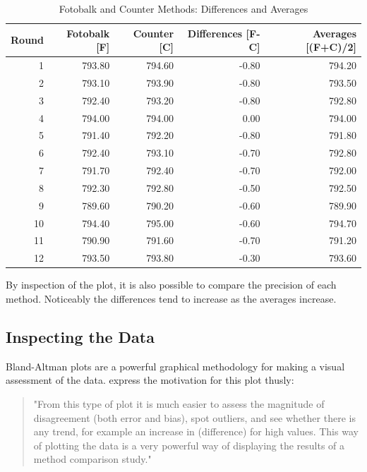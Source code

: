 \documentclass[Chap1main.tex]{subfiles}
\begin{document}
\begin{table}[tbh]
\begin{center}

\begin{tabular}{rrrrr}
  \hline
 Round & Fotobalk [F] & Counter [C] & Differences [F-C] & Averages [(F+C)/2] \\
  \hline
1 & 793.80 & 794.60 & -0.80 & 794.20 \\
  2 & 793.10 & 793.90 & -0.80 & 793.50 \\
  3 & 792.40 & 793.20 & -0.80 & 792.80 \\
  4 & 794.00 & 794.00 & 0.00 & 794.00 \\
  5 & 791.40 & 792.20 & -0.80 & 791.80 \\
  6 & 792.40 & 793.10 & -0.70 & 792.80 \\
  7 & 791.70 & 792.40 & -0.70 & 792.00 \\
  8 & 792.30 & 792.80 & -0.50 & 792.50 \\
  9 & 789.60 & 790.20 & -0.60 & 789.90 \\
  10 & 794.40 & 795.00 & -0.60 & 794.70 \\
  11 & 790.90 & 791.60 & -0.70 & 791.20 \\
  12 & 793.50 & 793.80 & -0.30 & 793.60 \\
   \hline
\end{tabular}
\caption{Fotobalk and Counter Methods: Differences and Averages}
\end{center}
\end{table}



\newpage
By inspection of the plot, it is also possible to compare the
precision of each method. Noticeably the differences tend to
increase as the averages increase.

\subsection{Inspecting the Data}
Bland-Altman plots are a powerful graphical methodology for making
a visual assessment of the data. \citet*{BA83} express the
motivation for this plot thusly:
\begin{quote}
"From this type of plot it is much easier to assess the magnitude
of disagreement (both error and bias), spot outliers, and see
whether there is any trend, for example an increase in
(difference) for high values. This way of plotting the data is a
very powerful way of displaying the results of a method comparison
study."
\end{quote}
\end{document}
